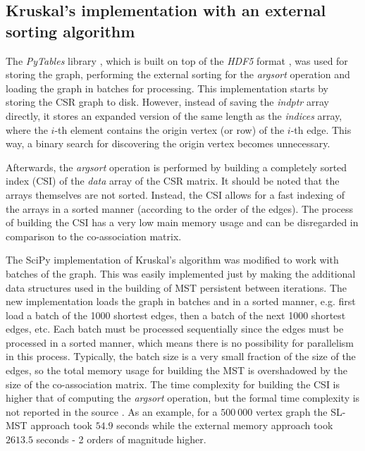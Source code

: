 \subsection{Kruskal's implementation with an external sorting algorithm}

The \emph{PyTables} library \cite{pytables}, which is built on top of the \emph{HDF5} format \cite{hdf5}, was used for storing the graph, performing the external sorting for the \emph{argsort} operation and loading the graph in batches for processing.
This implementation starts by storing the CSR graph to disk.
However, instead of saving the \emph{indptr} array directly, it stores an expanded version of the same length as the \emph{indices} array, where the $i$-th element contains the origin vertex (or row) of the $i$-th edge.
This way, a binary search for discovering the origin vertex becomes unnecessary.

Afterwards, the \emph{argsort} operation is performed by building a completely sorted index (CSI) \cite{AltetiAbad2007} of the \emph{data} array of the CSR matrix.
It should be noted that the arrays themselves are not sorted.
Instead, the CSI allows for a fast indexing of the arrays in a sorted manner (according to the order of the edges).
The process of building the CSI has a very low main memory usage and can be disregarded in comparison to the co-association matrix.

The SciPy implementation of Kruskal's algorithm was modified to work with batches of the graph.
This was easily implemented just by making the additional data structures used in the building of MST persistent between iterations.
The new implementation loads the graph in batches and in a sorted manner, e.g. first load a batch of the 1000 shortest edges, then a batch of the next 1000 shortest edges, etc.
Each batch must be processed sequentially since the edges must be processed in a sorted manner, which means there is no possibility for parallelism in this process.
Typically, the batch size is a very small fraction of the size of the edges, so the total memory usage for building the MST is overshadowed by the size of the co-association matrix.
The time complexity for building the CSI is higher that of computing the \emph{argsort} operation, but the formal time complexity is not reported in the source \cite{AltetiAbad2007}.
As an example, for a $500 \: 000$ vertex graph the SL-MST approach took $54.9$ seconds while the external memory approach took $2613.5$ seconds - 2 orders of magnitude higher.